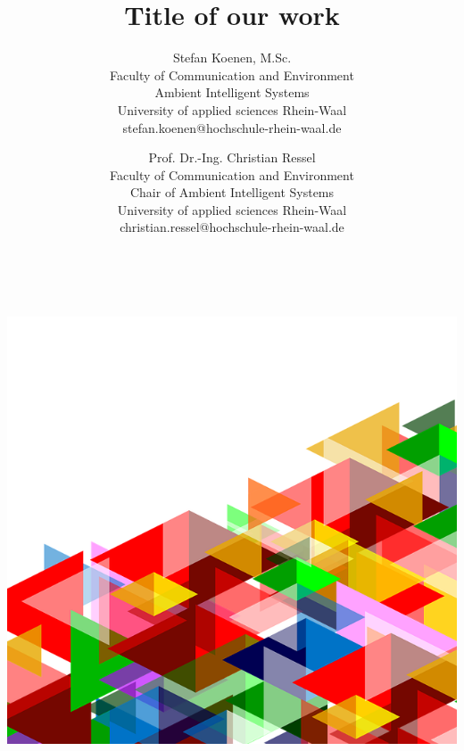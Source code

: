\documentclass[a4paper,twoside,11pt]{scrartcl}
\title{Title of our work}
\author{
  Stefan Koenen, M.Sc. \\
  Faculty of Communication and Environment \\
  Ambient Intelligent Systems \\
  University of applied sciences Rhein-Waal \\
  stefan.koenen@hochschule-rhein-waal.de \\

\and

  Prof. Dr.-Ing. Christian Ressel \\
  Faculty of Communication and Environment \\
  Chair of Ambient Intelligent Systems \\
  University of applied sciences Rhein-Waal \\
  christian.ressel@hochschule-rhein-waal.de
}
\date{~}
\begin{document}

\maketitle

\clearpage

\tableofcontents

\listoftables

\listoffigures

\clearpage
{}

%


\includegraphics[scale=0.5]{../graphics}


\end{document}
